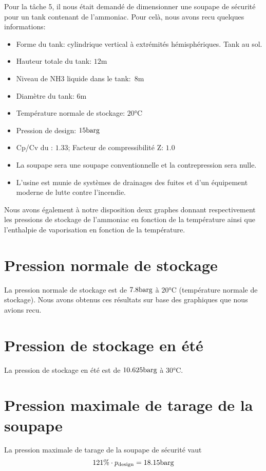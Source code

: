 Pour la t\^ache 5, il nous était demandé de dimensionner une soupape de sécurité
pour un tank contenant de l'ammoniac. Pour celà, nous avons recu quelques informations:
\begin{itemize}
\item{Forme du tank: cylindrique vertical à extrémités hémisphériques. Tank au sol.}
\item{Hauteur totale du tank: $12 \si{\meter}$}
\item{Niveau de NH3 liquide dans le tank: $8 \si{\meter}$}
\item{Diamètre du tank: $6 \si{\meter}$}
\item{Température normale de stockage: $20 \si{\degreeCelsius}$}
\item{Pression de design: $15 \si{\bar}\text{g}$}
\item{Cp/Cv du : $1.33$; Facteur de compressibilité Z: $1.0$}
\item{La soupape sera une soupape conventionnelle et la contrepression sera nulle.}
\item{L’usine est munie de systèmes de drainages des fuites et d’un équipement moderne de lutte contre l’incendie.}
\end{itemize}
Nous avons également à notre disposition deux graphes donnant respectivement les pressions de stockage
de l'ammoniac en fonction de la température ainsi que l'enthalpie de vaporisation en fonction de la température. 

\section{Pression normale de stockage} 
La pression normale de stockage est de $7.8 \si{\bar}\text{g}$ à $20\si{\celsius}$ 
(température normale de stockage). Nous avons obtenus ces résultats sur base des
graphiques que nous avions recu.

\section{Pression de stockage en été} 
La pression de stockage en été est de $10.625 \si{\bar}\text{g}$ à $30\si{\celsius}$.

\section{Pression maximale de tarage de la soupape} 
La pression maximale de tarage de la soupape de sécurité vaut 
\[ 121\% \cdot p_{\text{design}} = 18.15 \si{\bar}\text{g} \]

